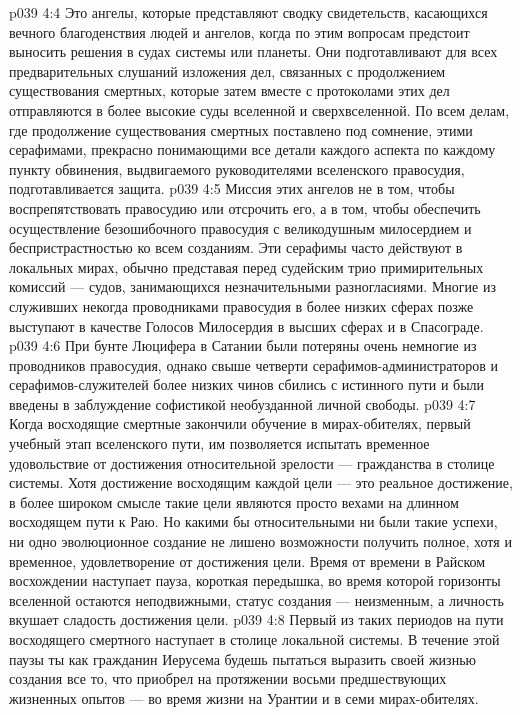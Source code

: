 \vs p039 4:4 \pc {}\bibnobreakspace {} Это ангелы, которые представляют сводку свидетельств, касающихся вечного благоденствия людей и ангелов, когда по этим вопросам предстоит выносить решения в судах системы или планеты. Они подготавливают для всех предварительных слушаний изложения дел, связанных с продолжением существования смертных, которые затем вместе с протоколами этих дел отправляются в более высокие суды вселенной и сверхвселенной. По всем делам, где продолжение существования смертных поставлено под сомнение, этими серафимами, прекрасно понимающими все детали каждого аспекта по каждому пункту обвинения, выдвигаемого руководителями вселенского правосудия, подготавливается защита.
\vs p039 4:5 Миссия этих ангелов не в том, чтобы воспрепятствовать правосудию или отсрочить его, а в том, чтобы обеспечить осуществление безошибочного правосудия с великодушным милосердием и беспристрастностью ко всем созданиям. Эти серафимы часто действуют в локальных мирах, обычно представая перед судейским трио примирительных комиссий --- судов, занимающихся незначительными разногласиями. Многие из служивших некогда проводниками правосудия в более низких сферах позже выступают в качестве Голосов Милосердия в высших сферах и в Спасограде.
\vs p039 4:6 При бунте Люцифера в Сатании были потеряны очень немногие из проводников правосудия, однако свыше четверти серафимов\hyp{}администраторов и серафимов\hyp{}служителей более низких чинов сбились с истинного пути и были введены в заблуждение софистикой необузданной личной свободы.
\vs p039 4:7 \pc {}\bibnobreakspace {} Когда восходящие смертные закончили обучение в мирах\hyp{}обителях, первый учебный этап вселенского пути, им позволяется испытать временное удовольствие от достижения относительной зрелости --- гражданства в столице системы. Хотя достижение восходящим каждой цели --- это реальное достижение, в более широком смысле такие цели являются просто вехами на длинном восходящем пути к Раю. Но какими бы относительными ни были такие успехи, ни одно эволюционное создание не лишено возможности получить полное, хотя и временное, удовлетворение от достижения цели. Время от времени в Райском восхождении наступает пауза, короткая передышка, во время которой горизонты вселенной остаются неподвижными, статус создания --- неизменным, а личность вкушает сладость достижения цели.
\vs p039 4:8 Первый из таких периодов на пути восходящего смертного наступает в столице локальной системы. В течение этой паузы ты как гражданин Иерусема будешь пытаться выразить своей жизнью создания все то, что приобрел на протяжении восьми предшествующих жизненных опытов --- во время жизни на Урантии и в семи мирах\hyp{}обителях.

